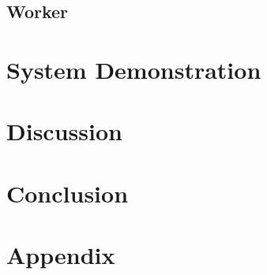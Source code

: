 \documentclass[a4paper,12pt,oldfontcommands]{memoir}
\begin{document}
\section{Worker}

\chapter{System Demonstration}

\chapter{Discussion}

\chapter{Conclusion}





\appendix
\appendixpage

\chapter{Appendix}

\listoftodos
\end{document}

